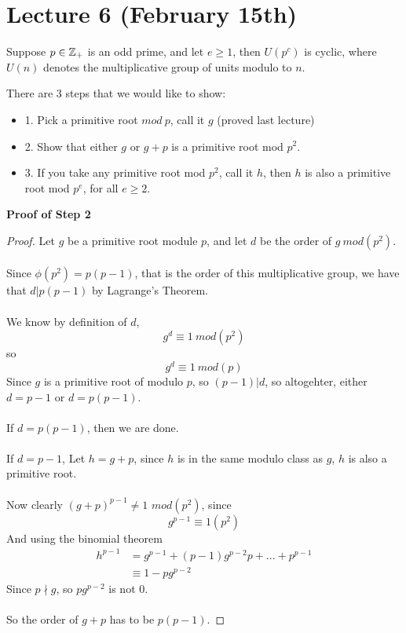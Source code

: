 \section{Lecture 6 (February 15th)}

\begin{theorem}
Suppose $p \in \mathbb{Z}_+$ is an odd prime, and let $e \geq 1$, then $U(p^c)$ is cyclic, where $U(n)$ denotes the multiplicative group of units modulo to $n$.
\end{theorem}

\noindent There are 3 steps that we would like to show:
\begin{itemize}
    \item 1. Pick a primitive root $mod\ p$, call it $g$ (proved last lecture)
    \item 2. Show that either $g$ or $g + p$ is a primitive root mod $p^2$.
    \item 3. If you take any primitive root mod $p^2$, call it $h$, then $h$ is also a primitive root mod $p^e$, for all $e \geq 2$.
\end{itemize}

{\bf Proof of Step 2}
\begin{proof}
Let $g$ be a primitive root module $p$, and let $d$ be the order of $g\ mod(p^2)$.\\\\
Since $\phi(p^2) = p(p-1)$, that is the order of this multiplicative group, we have that $d | p(p-1)$ by Lagrange's Theorem.\\\\
We know by definition of $d$,
\[g^d \equiv 1\ mod(p^2)\]
so
\[g^d \equiv 1\ mod(p)\]
Since $g$ is a primitive root of modulo $p$, so $(p - 1) | d$, so altogehter, either $d = p - 1$ or $d = p(p-1)$.\\\\
If $d = p(p - 1)$, then we are done.\\\\
If $d = p - 1$, Let $h = g + p$, since $h$ is in the same modulo class as $g$, $h$ is also a primitive root.\\\\
Now clearly $(g + p)^{p - 1} \neq 1$ $mod(p^2)$, since
\[g^{p-1} \equiv 1(p^2)\]
And using the binomial theorem
\begin{align*}
    h^{p - 1} &= g^{p - 1} + (p - 1)g^{p - 2}p + ... + p^{p - 1}\\
    &\equiv 1 - pg^{p - 2}
\end{align*}
Since $p \nmid g$, so $pg^{p - 2}$ is not 0.\\\\
So the order of $g + p$ has to be $p(p-1)$.
\end{proof}

